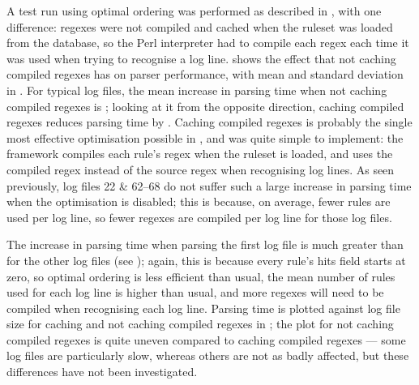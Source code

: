 A test run using optimal ordering was performed as described in
, with one difference: regexes were not
compiled and cached when the ruleset was loaded from the database, so the
Perl interpreter had to compile each regex each time it was used when
trying to recognise a log line.   shows the effect that not
caching compiled regexes has on parser performance, with mean and standard
deviation in .  For typical log files, the mean increase in
parsing time when not caching compiled regexes is
; looking at
it from the opposite direction, caching compiled regexes reduces parsing
time by
.
Caching compiled regexes is probably the single most effective optimisation
possible in \parsername{}, and was quite simple to implement: the framework
compiles each rule's regex when the ruleset is loaded, and uses the
compiled regex instead of the source regex when recognising log lines.  As
seen previously, log files 22 \& 62--68 do not suffer such a large increase
in parsing time when the optimisation is disabled; this is because, on
average, fewer rules are used per log line, so fewer regexes are compiled
per log line for those log files.

The increase in parsing time when parsing the first log file is much
greater than for the other log files (see ); again, this is
because every rule's hits field starts at zero, so optimal ordering is less
efficient than usual, the mean number of rules used for each log line is
higher than usual, and more regexes will need to be compiled when
recognising each log line.  Parsing time is plotted against log file size
for caching and not caching compiled regexes in ; the plot for not caching compiled regexes is quite uneven
compared to caching compiled regexes --- some log files are particularly
slow, whereas others are not as badly affected, but these differences have
not been investigated.


